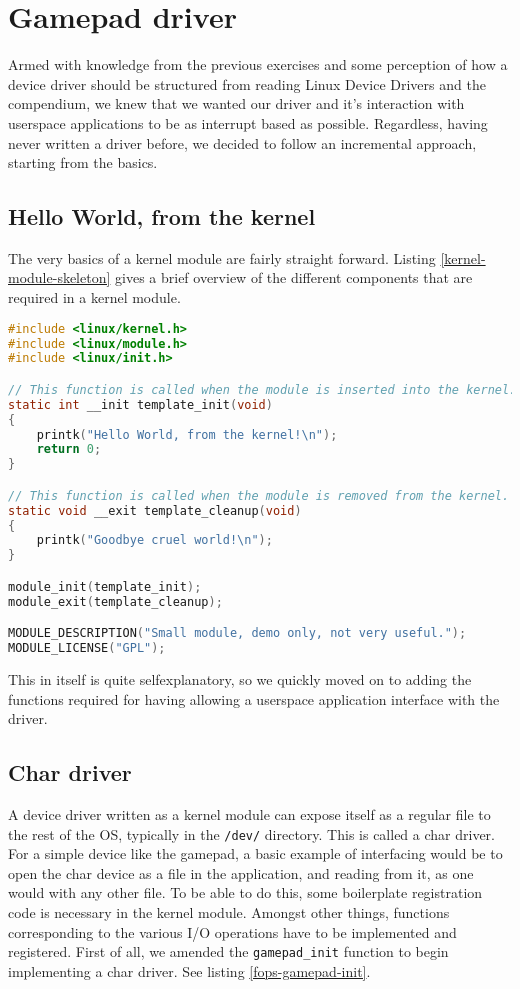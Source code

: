 \section{Gamepad driver}

Armed with knowledge from the previous exercises and some perception of how a device driver should be structured from reading Linux Device Drivers \cite{ldd} and the compendium, we knew that we wanted our driver and it's interaction with userspace applications to be as interrupt based as possible. Regardless, having never written a driver before, we decided to follow an incremental approach, starting from the basics.

\subsection{Hello World, from the kernel}

The very basics of a kernel module are fairly straight forward. Listing \ref{kernel-module-skeleton} gives a brief overview of the different components that are required in a kernel module.

\begin{lstlisting}[language=C, label=kernel-module-skeleton, caption=Basic kernel module]
#include <linux/kernel.h>
#include <linux/module.h>
#include <linux/init.h>

// This function is called when the module is inserted into the kernel.
static int __init template_init(void)
{
    printk("Hello World, from the kernel!\n");
    return 0;
}

// This function is called when the module is removed from the kernel.
static void __exit template_cleanup(void)
{
    printk("Goodbye cruel world!\n");
}

module_init(template_init);
module_exit(template_cleanup);

MODULE_DESCRIPTION("Small module, demo only, not very useful.");
MODULE_LICENSE("GPL");
\end{lstlisting}

This in itself is quite selfexplanatory, so we quickly moved on to adding the functions required for having allowing a userspace application interface with the driver.

\subsection{Char driver}

A device driver written as a kernel module can expose itself as a regular file to the rest of the OS, typically in the \texttt{/dev/} directory.
This is called a char driver. For a simple device like the gamepad, a basic example of interfacing would be to open the char device as a file in the application, and reading from it, as one would with any other file. To be able to do this, some boilerplate registration code is necessary in the kernel module. Amongst other things, functions corresponding to the various I/O operations have to be implemented and registered. First of all, we amended the \texttt{gamepad\_init} function to begin implementing a char driver. See listing \ref{fops-gamepad-init}.

